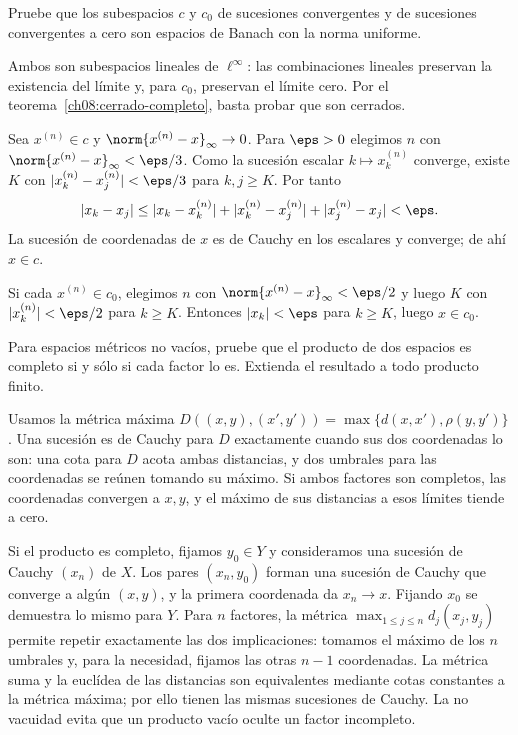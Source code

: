 \begin{ejercicio}
Pruebe que los subespacios $c$ y $c_0$ de sucesiones convergentes y de sucesiones convergentes a cero son espacios de Banach con la norma uniforme.
\end{ejercicio}
\begin{solucion}
Ambos son subespacios lineales de $\ell^\infty$: las combinaciones lineales preservan la existencia del límite y, para $c_0$, preservan el límite cero. Por el teorema~\ref{ch08:cerrado-completo}, basta probar que son cerrados.

Sea $x^{(n)}\in c$ y $\norm{x^{(n)}-x}_\infty\to0$. Para $\eps>0$ elegimos $n$ con $\norm{x^{(n)}-x}_\infty<\eps/3$. Como la sucesión escalar $k\mapsto x^{(n)}_k$ converge, existe $K$ con $|x^{(n)}_k-x^{(n)}_j|<\eps/3$ para $k,j\geq K$. Por tanto
\[
 |x_k-x_j|\leq|x_k-x^{(n)}_k|+|x^{(n)}_k-x^{(n)}_j|+|x^{(n)}_j-x_j|<\eps.
\]
La sucesión de coordenadas de $x$ es de Cauchy en los escalares y converge; de ahí $x\in c$.

Si cada $x^{(n)}\in c_0$, elegimos $n$ con $\norm{x^{(n)}-x}_\infty<\eps/2$ y luego $K$ con $|x^{(n)}_k|<\eps/2$ para $k\geq K$. Entonces $|x_k|<\eps$ para $k\geq K$, luego $x\in c_0$.
\end{solucion}

\begin{ejercicio}
Para espacios métricos no vacíos, pruebe que el producto de dos espacios es completo si y sólo si cada factor lo es. Extienda el resultado a todo producto finito.
\end{ejercicio}
\begin{solucion}
Usamos la métrica máxima $D((x,y),(x',y'))=\max\{d(x,x'),\rho(y,y')\}$. Una sucesión es de Cauchy para $D$ exactamente cuando sus dos coordenadas lo son: una cota para $D$ acota ambas distancias, y dos umbrales para las coordenadas se reúnen tomando su máximo. Si ambos factores son completos, las coordenadas convergen a $x,y$, y el máximo de sus distancias a esos límites tiende a cero.

Si el producto es completo, fijamos $y_0\in Y$ y consideramos una sucesión de Cauchy $(x_n)$ de $X$. Los pares $(x_n,y_0)$ forman una sucesión de Cauchy que converge a algún $(x,y)$, y la primera coordenada da $x_n\to x$. Fijando $x_0$ se demuestra lo mismo para $Y$. Para $n$ factores, la métrica $\max_{1\leq j\leq n}d_j(x_j,y_j)$ permite repetir exactamente las dos implicaciones: tomamos el máximo de los $n$ umbrales y, para la necesidad, fijamos las otras $n-1$ coordenadas. La métrica suma y la euclídea de las distancias son equivalentes mediante cotas constantes a la métrica máxima; por ello tienen las mismas sucesiones de Cauchy. La no vacuidad evita que un producto vacío oculte un factor incompleto.
\end{solucion}

